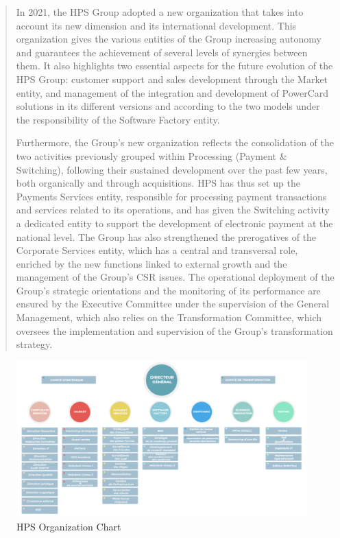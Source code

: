 \documentclass[12pt,a4paper]{report}
\begin{document}
\begin{quote}
In 2021, the HPS Group adopted a new organization that takes into account its new dimension and its international development. This organization gives the various entities of the Group increasing autonomy and guarantees the achievement of several levels of synergies between them. It also highlights two essential aspects for the future evolution of the HPS Group: customer support and sales development through the Market entity, and management of the integration and development of PowerCard solutions in its different versions and according to the two models under the responsibility of the Software Factory entity.

Furthermore, the Group's new organization reflects the consolidation of the two activities previously grouped within Processing (Payment \& Switching), following their sustained development over the past few years, both organically and through acquisitions. HPS has thus set up the Payments Services entity, responsible for processing payment transactions and services related to its operations, and has given the Switching activity a dedicated entity to support the development of electronic payment at the national level. The Group has also strengthened the prerogatives of the Corporate Services entity, which has a central and transversal role, enriched by the new functions linked to external growth and the management of the Group's CSR issues. The operational deployment of the Group's strategic orientations and the monitoring of its performance are ensured by the Executive Committee under the supervision of the General Management, which also relies on the Transformation Committee, which oversees the implementation and supervision of the Group's transformation strategy.
\end{quote}

\begin{figure}[H]
\centering
\includegraphics[width=6.4in]{media/image24.png}
\caption{HPS Organization Chart}
\label{fig:hpsOrgChart}
\end{figure}
\end{document}
